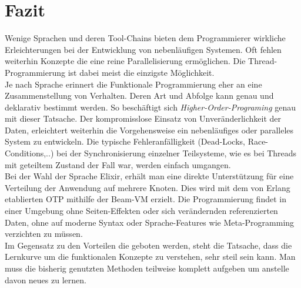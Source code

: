 \documentclass[10pt,journal,compsoc]{IEEEtran}
\begin{document}
\section{Fazit}
Wenige Sprachen und deren Tool-Chains bieten dem Programmierer wirkliche Erleichterungen bei der Entwicklung von nebenläufigen Systemen. Oft fehlen weiterhin Konzepte die eine reine Parallelisierung ermöglichen. Die Thread-Programmierung ist dabei meist die einzigste Möglichkeit. \\
Je nach Sprache erinnert die Funktionale Programmierung eher an eine Zusammenstellung von Verhalten. Deren Art und Abfolge kann genau und deklarativ bestimmt werden. So beschäftigt sich \textit{Higher-Order-Programing} genau mit dieser Tatsache.
Der kompromisslose Einsatz von Unveränderlichkeit der Daten, erleichtert weiterhin die Vorgehensweise ein nebenläufiges oder paralleles System zu entwickeln.
Die typische Fehleranfälligkeit (Dead-Locks, Race-Conditions,..) bei der Synchronisierung einzelner Teilsysteme, wie es bei Threads mit geteiltem Zustand der Fall war, werden einfach umgangen.
\\Bei der Wahl der Sprache Elixir, erhält man eine direkte Unterstützung für eine Verteilung der Anwendung auf mehrere Knoten. Dies wird mit dem von Erlang etablierten OTP mithilfe der Beam-VM erzielt. Die Programmierung findet in einer Umgebung ohne Seiten-Effekten oder sich verändernden referenzierten Daten, ohne auf moderne Syntax oder Sprache-Features wie Meta-Programming verzichten zu müssen.
\\ Im Gegensatz zu den Vorteilen die geboten werden, steht die Tatsache, dass die Lernkurve um die funktionalen Konzepte zu verstehen, sehr steil sein kann.
Man muss die bisherig genutzten Methoden teilweise komplett aufgeben um anstelle davon neues zu lernen.
%
%

\end{document}
